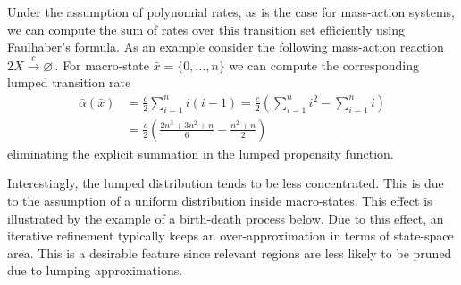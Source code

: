 Under the assumption of polynomial rates, as is the case for mass-action
systems, we can compute the sum of rates over this transition set
efficiently using Faulhaber's formula.
As an example consider the following mass-action reaction
$ 2 X \xrightarrow{c} \varnothing\,. $
For macro-state
$\bar{x} = \{0, \dots, n\}$
we can compute the corresponding lumped transition rate
\begin{align*}
	\bar{\alpha}(\bar{x})
	& =\frac{c}{2}\sum_{i=1}^n i (i - 1) 
	=\frac{c}{2}\left(\sum_{i=1}^n i^2 - \sum_{i=1}^ni\right)\\
	& =\frac{c}{2}\left(\frac{2n^3+3n^2+n}{6} - \frac{n^2 + n}{2}\right)
\end{align*}
eliminating the explicit summation in the lumped propensity function.

Interestingly, the lumped distribution
tends to be less concentrated. %
This is due to the assumption of a
uniform distribution inside macro-states.
This effect is illustrated by the example of a birth-death process below.
Due to this effect, an iterative refinement typically keeps an over-approximation in terms of state-space area.
This is a desirable feature since relevant regions are less likely to be pruned due to lumping approximations.


